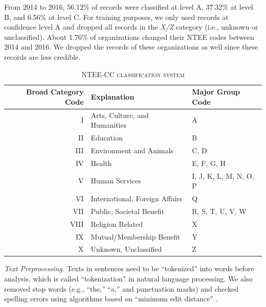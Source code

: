\documentclass[11pt]{article}
\begin{document}
From 2014 to 2016, 56.12\% of records were classified at level A, 37.32\% at level B, and 6.56\% at level C. For training purposes, we only used records at confidence level A and dropped all records in the \textit{X/Z} category (i.e., unknown or unclassified). About 1.76\% of organizations changed their NTEE codes between 2014 and 2016. We dropped the records of these organizations as well since these records are less credible.

\begin{table}[]
    \centering
    \begin{tabularx}{0.9\textwidth}{r|X|X}
    	 \hline
         Broad Category Code & Explanation & Major Group Code \\
         \hline
		I & Arts, Culture, and Humanities & A \\
		II & Education & B \\
		III & Environment and Animals & C, D \\
		IV & Health & E, F, G, H \\
		V & Human Services & I, J, K, L, M, N, O, P \\
		VI & International, Foreign Affairs & Q \\
		VII & Public, Societal Benefit & R, S, T, U, V, W \\
		VIII & Religion Related & X \\
		IX & Mutual/Membership Benefit & Y \\
		X & Unknown, Unclassified & Z \\
         \hline
    \end{tabularx}
    \caption{\textsc{NTEE-CC classification system}} \label{tab:classification}
\end{table}


\textit{Text Preprocessing.} Texts in sentences need to be ``tokenized'' into words before analysis, which is called ``tokenization'' in natural language processing. We also removed stop words (e.g., ``the,'' ``a,'' and punctuation marks) and checked spelling errors using algorithms based on ``minimum edit distance'' \parencite[i.e., the minimum number of editing operations needed to change one word into another;][26]{JurafskySpeechLanguageProcessing2017}.
\end{document}
